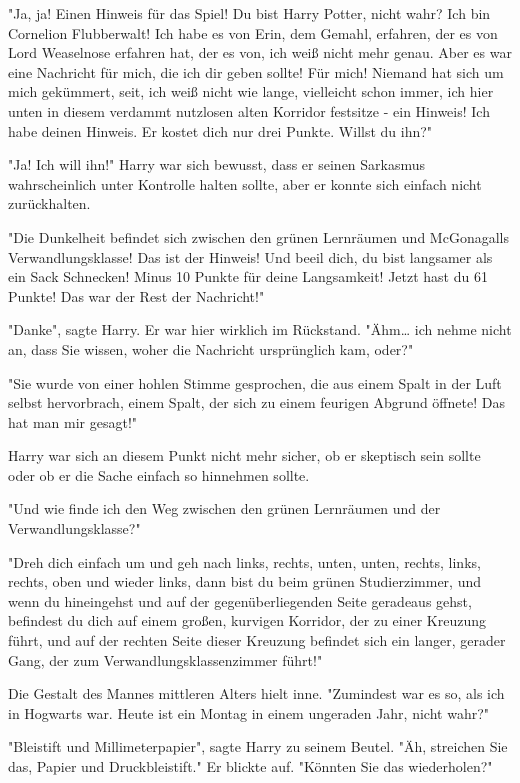 {"Ja, ja! Einen Hinweis für das Spiel! Du bist Harry Potter, nicht wahr? Ich bin Cornelion Flubberwalt! Ich habe es von Erin, dem Gemahl, erfahren, der es von Lord Weaselnose erfahren hat, der es von, ich weiß nicht mehr genau. Aber es war eine Nachricht für mich, die ich dir geben sollte! Für mich! Niemand hat sich um mich gekümmert, seit, ich weiß nicht wie lange, vielleicht schon immer, ich hier unten in diesem verdammt nutzlosen alten Korridor festsitze - ein Hinweis! Ich habe deinen Hinweis. Er kostet dich nur drei Punkte. Willst du ihn?"

"Ja! Ich will ihn!" Harry war sich bewusst, dass er seinen Sarkasmus wahrscheinlich unter Kontrolle halten sollte, aber er konnte sich einfach nicht zurückhalten.

"Die Dunkelheit befindet sich zwischen den grünen Lernräumen und McGonagalls Verwandlungsklasse! Das ist der Hinweis! Und beeil dich, du bist langsamer als ein Sack Schnecken! Minus 10 Punkte für deine Langsamkeit! Jetzt hast du 61 Punkte! Das war der Rest der Nachricht!"

"Danke", sagte Harry. Er war hier wirklich im Rückstand. "Ähm… ich nehme nicht an, dass Sie wissen, woher die Nachricht ursprünglich kam, oder?"

"Sie wurde von einer hohlen Stimme gesprochen, die aus einem Spalt in der Luft selbst hervorbrach, einem Spalt, der sich zu einem feurigen Abgrund öffnete! Das hat man mir gesagt!"

Harry war sich an diesem Punkt nicht mehr sicher, ob er skeptisch sein sollte oder ob er die Sache einfach so hinnehmen sollte.

"Und wie finde ich den Weg zwischen den grünen Lernräumen und der Verwandlungsklasse?"

"Dreh dich einfach um und geh nach links, rechts, unten, unten, rechts, links, rechts, oben und wieder links, dann bist du beim grünen Studierzimmer, und wenn du hineingehst und auf der gegenüberliegenden Seite geradeaus gehst, befindest du dich auf einem großen, kurvigen Korridor, der zu einer Kreuzung führt, und auf der rechten Seite dieser Kreuzung befindet sich ein langer, gerader Gang, der zum Verwandlungsklassenzimmer führt!"

Die Gestalt des Mannes mittleren Alters hielt inne. "Zumindest war es so, als ich in Hogwarts war. Heute ist ein Montag in einem ungeraden Jahr, nicht wahr?"

"Bleistift und Millimeterpapier", sagte Harry zu seinem Beutel. "Äh, streichen Sie das, Papier und Druckbleistift." Er blickte auf. "Könnten Sie das wiederholen?"

}
